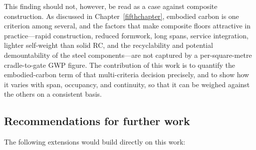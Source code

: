 This finding should not, however, be read as a case against composite construction. As discussed in Chapter~\ref{fifthchapter}, embodied carbon is one criterion among several, and the factors that make composite floors attractive in practice---rapid construction, reduced formwork, long spans, service integration, lighter self-weight than solid RC, and the recyclability and potential demountability of the steel components---are not captured by a per-square-metre cradle-to-gate GWP figure. The contribution of this work is to quantify the embodied-carbon term of that multi-criteria decision precisely, and to show how it varies with span, occupancy, and continuity, so that it can be weighed against the others on a consistent basis. 

\subsection{Recommendations for further work}
\label{sec:concl_future}
The following extensions would build directly on this work:

